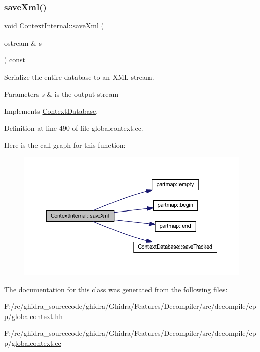 \subsubsection{\texorpdfstring{saveXml()}{saveXml()}}
{\footnotesize\ttfamily void Context\+Internal\+::save\+Xml (\begin{DoxyParamCaption}\item[{ostream \&}]{s }\end{DoxyParamCaption}) const\hspace{0.3cm}{\ttfamily [virtual]}}



Serialize the entire database to an X\+ML stream. 


\begin{DoxyParams}{Parameters}
{\em s} & is the output stream \\
\hline
\end{DoxyParams}


Implements \mbox{\hyperlink{class_context_database_aaf116d099044b04dbcb6d83a079b1836}{Context\+Database}}.



Definition at line 490 of file globalcontext.\+cc.

Here is the call graph for this function\+:
\nopagebreak
\begin{figure}[H]
\begin{center}
\leavevmode
\includegraphics[width=350pt]{class_context_internal_a98a632ce5decb052fdf7057d6b6433ed_cgraph}
\end{center}
\end{figure}


The documentation for this class was generated from the following files\+:\begin{DoxyCompactItemize}
\item 
F\+:/re/ghidra\+\_\+sourcecode/ghidra/\+Ghidra/\+Features/\+Decompiler/src/decompile/cpp/\mbox{\hyperlink{globalcontext_8hh}{globalcontext.\+hh}}\item 
F\+:/re/ghidra\+\_\+sourcecode/ghidra/\+Ghidra/\+Features/\+Decompiler/src/decompile/cpp/\mbox{\hyperlink{globalcontext_8cc}{globalcontext.\+cc}}\end{DoxyCompactItemize}
